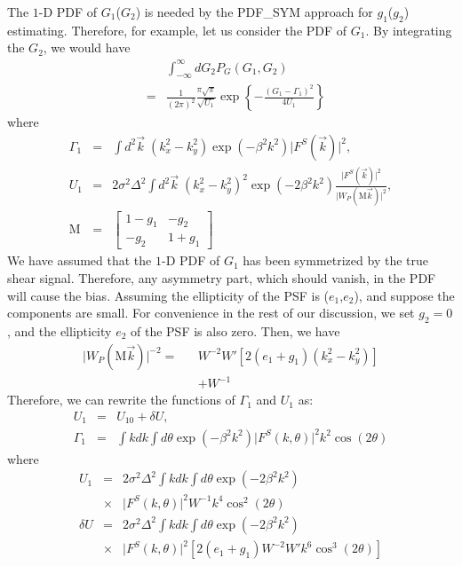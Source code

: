 \documentclass[twocolumn]{aastex62}
\begin{document}
The $1$-D PDF of $G_1$($G_2$) is needed by the PDF\_SYM approach for $g_1$($g_2$) estimating. Therefore, for example, let us consider the PDF of $G_1$. By integrating the $G_2$, we would have
\begin{eqnarray}
\label{1d_PDF}
&&\int_{-\infty}^{\infty}dG_2 P_G\left(G_1,G_2\right)\\ \nonumber
&=&\frac{1}{(2\pi)^2}\frac{\pi\sqrt{\pi}}{\sqrt{U_1}}\exp\left\{-\frac{\left(G_1-\Gamma_1\right)^2}{4U_1}\right\}
\end{eqnarray}
where
\begin{eqnarray}
\Gamma_1&=&\int{d}^2\vec{k}\;\left(k_x^2-k_y^2\right)\exp(-\beta^2k^2)\vert F^S(\vec{k})\vert^2, \\ \nonumber
U_1&=&2\sigma^2\Delta^2\int{d}^2\vec{k} \; \left(k_x^2-k_y^2\right)^2\exp(-2\beta^2k^2)\frac{\vert F^S(\vec{k})\vert^2}{\vert W_{P}(\mathrm{M}\vec{k})\vert^2}, \\ \nonumber
\mathrm{M}&=&\left[\begin{array}{cc}
1-g_1 &  -g_2 \\
-g_2 &  1+g_1 
\end{array}\right]
\end{eqnarray}
We have assumed that the $1$-D PDF of $G_1$ has been symmetrized by the true shear signal. Therefore, any asymmetry part, which should vanish, in the PDF will cause the bias. Assuming the ellipticity of the PSF is ($e_1$,$e_2$), and suppose the components are small. For convenience in the rest of our discussion, we set $g_2=0$, and the ellipticity $e_2$ of the PSF is also zero. Then, we have
\begin{eqnarray}
\vert W_{P}(\mathrm{M}\vec{k})\vert^{-2}=&& W^{-2}W'[2(e_1+g_1)(k_x^2-k_y^2)] \\ \nonumber&&+W^{-1}
\end{eqnarray}
Therefore, we can rewrite the functions of $\Gamma_1$ and $U_1$ as:
\begin{eqnarray}
U_1&=&U_{10}+\delta U,\\ \nonumber
\Gamma_1&=&\int kdk\int d\theta \exp(-\beta^2k^2)\vert F^S(k,\theta)\vert^2k^2\cos(2\theta)
\end{eqnarray}
where
\begin{eqnarray}
U_1 &=& 2\sigma^2\Delta^2\int kdk\int d\theta\exp(-2\beta^2k^2) \\ \nonumber
&\times&\vert F^S(k,\theta)\vert^2W^{-1}k^4 \cos^2(2\theta) \\ \nonumber
\delta U &=& 2\sigma^2\Delta^2\int kdk\int d\theta\exp(-2\beta^2k^2) \\ \nonumber
&\times&\vert F^S(k,\theta)\vert^2\left[ 2(e_1+g_1)W^{-2}W'k^6\cos^3(2\theta)\right]
\end{eqnarray}
\end{document}
